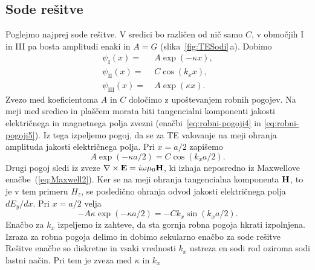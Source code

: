 \subsection*{Sode rešitve}
Poglejmo najprej sode rešitve. V sredici bo različen od nič samo $C$, 
v območjih I in III pa bosta amplitudi enaki in $A = G$ (slika~\ref{fig:TESodi}\,a). 
Dobimo 
\begin{align}
\psi_{\mathrm{I}}(x) =&~ A \exp(-\kappa x), \\
\psi_{\mathrm{II}}(x) =&~ C \cos(k_x x),\\
\psi_{\mathrm{III}}(x) =&~ A \exp(\kappa x).
\end{align}
Zvezo med koeficientoma $A$ in $C$ določimo z upoštevanjem robnih pogojev. Na meji
med sredico in plaščem morata biti tangencialni komponenti 
jakosti električnega in magnetnega polja zvezni (enačbi~\ref{eq:robni-pogoji4} in 
\ref{eq:robni-pogoji5}). Iz tega izpeljemo pogoj, da se za TE valovanje
na meji ohranja amplituda jakosti električnega polja. Pri $x = a/2$ zapišemo
\begin{equation}
A \exp(-\kappa a/2) = C \cos(k_x a/2).
\end{equation}
Drugi pogoj sledi iz zveze $\nabla\times{\bf E}=i\omega\mu_{0}{\bf H}$, ki izhaja
neposredno iz Maxwellove enačbe~(\ref{eq:Maxwell2}). Ker se na meji ohranja
tangencialna komponenta ${\bf H}$, to je v tem primeru $H_z$, se posledično ohranja 
odvod jakosti električnega polja $dE_y/dx$. 
Pri $x = a/2$  velja
\begin{equation}
-A \kappa \exp(-\kappa a/2) = -C k_x \sin(k_x a/2).
\end{equation}
Enačbo za $k_x$ izpeljemo iz zahteve, da sta gornja robna 
pogoja hkrati izpolnjena. Izraza za robna pogoja delimo in dobimo sekularno 
enačbo za sode rešitve 
Rešitve enačbe so diskretne in vsaki vrednosti $k_x$ ustreza 
en sodi rod oziroma sodi lastni način. Pri tem je zveza med $\kappa$ in $k_x$  

